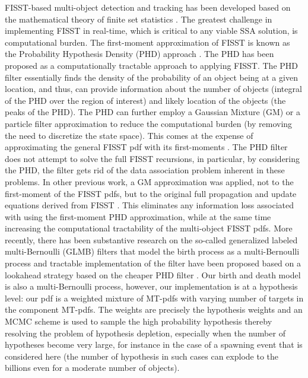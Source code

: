 \documentclass[10pt, conference]{IEEEtran}
\begin{document}
FISST-based multi-object detection and tracking has been developed based on the mathematical theory of finite set statistics \cite{Mahler:97,Mahler:07}.  The greatest challenge in implementing FISST in real-time, which is critical to any viable SSA solution, is computational burden. The first-moment approximation of FISST  is known as the Probability Hypothesis Density (PHD) approach \cite{Mahler:07,Vo06}. The PHD has been proposed as a computationally tractable approach to applying FISST. The PHD filter essentially finds the density of the probability of an object being at a given location, and thus, can provide information about the number of objects (integral of the PHD over the region of interest) and likely location of the objects (the peaks of the PHD). The PHD can further employ a Gaussian Mixture (GM) or a particle filter approximation to reduce the computational burden (by removing the need to discretize the state space). This comes at the expense of approximating the general FISST pdf with its first-moments \cite{Vo06, Vo_SMC, Vo_CPHD, Clark_PHD}. The PHD filter does not attempt to solve the full FISST recursions, in particular, by considering the PHD, the filter gets rid of the data association problem inherent in these problems. In other previous work, a GM approximation was applied, not to the first-moment of the FISST pdfs, but to the original full propagation and update equations derived from FISST \cite{Hussein:12GNC,Hussein:12b}. This eliminates any information loss associated with using the first-moment PHD approximation, while at the same time increasing the computational tractability of the multi-object FISST pdfs. More recently, there has been substantive research on the so-called generalized labeled multi-Bernoulli (GLMB) filters that model the birth process as a multi-Bernoulli process and tractable implementation of the filter have been proposed based on a lookahead strategy based on the cheaper PHD filter \cite{MB_FISST1, MB_FISST2}. Our birth and death model is also a multi-Bernoulli process, however, our implementation is at a hypothesis level: our pdf is a weighted mixture of MT-pdfs with varying number of targets in the component MT-pdfs. The weights are precisely the hypothesis weights and an MCMC scheme is used to sample the high probability hypothesis thereby resolving the problem of hypothesis depletion, especially when the number of hypotheses become very large, for instance in the case of a spawning event that is considered here (the number of hypothesis in such cases can explode to the billions even for a moderate number of objects).
\end{document}
